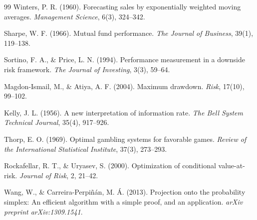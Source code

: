 \documentclass[12pt,a4paper,openany,oneside]{report}
\numberwithin{equation}{chapter}
\begin{document}
\begin{thebibliography}{99}
Winters, P. R. (1960). Forecasting sales by exponentially weighted
moving averages. \emph{Management Science}, 6(3), 324--342.

Sharpe, W. F. (1966). Mutual fund performance. \emph{The Journal of
Business}, 39(1), 119--138.

Sortino, F. A., \& Price, L. N. (1994). Performance measurement in a
downside risk framework. \emph{The Journal of Investing}, 3(3), 59--64.

Magdon-Ismail, M., \& Atiya, A. F. (2004). Maximum drawdown.
\emph{Risk}, 17(10), 99--102.

Kelly, J. L. (1956). A new interpretation of information rate.
\emph{The Bell System Technical Journal}, 35(4), 917--926.

Thorp, E. O. (1969). Optimal gambling systems for favorable games.
\emph{Review of the International Statistical Institute}, 37(3), 273--293.

Rockafellar, R. T., \& Uryasev, S. (2000). Optimization of conditional
value-at-risk. \emph{Journal of Risk}, 2, 21--42.

Wang, W., \& Carreira-Perpiñán, M. Á. (2013). Projection onto the
probability simplex: An efficient algorithm with a simple proof, and
an application. \emph{arXiv preprint arXiv:1309.1541}.

\end{thebibliography}
\end{document}
